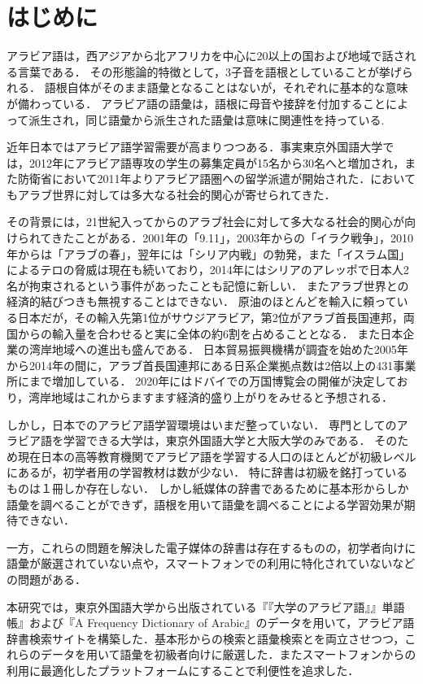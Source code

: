 \documentclass[technicalreport]{ieicej}
\begin{document}
\section{はじめに}
アラビア語は，西アジアから北アフリカを中心に20以上の国および地域で話される言葉である．
その形態論的特徴として，3子音を語根としていることが挙げられる．
語根自体がそのまま語彙となることはないが，それぞれに基本的な意味が備わっている．
アラビア語の語彙は，語根に母音や接辞を付加することによって派生され，同じ語彙から派生された語彙は意味に関連性を持っている.

近年日本ではアラビア語学習需要が高まりつつある．事実東京外国語大学では，2012年にアラビア語専攻の学生の募集定員が15名から30名へと増加され，また防衛省において2011年よりアラビア語圏への留学派遣が開始された\cite{nikkei}．においてもアラブ世界に対しては多大なる社会的関心が寄せられてきた．

その背景には，21世紀入ってからのアラブ社会に対して多大なる社会的関心が向けられてきたことがある．2001年の「9.11」，2003年からの「イラク戦争」，2010年からは「アラブの春」，翌年には「シリア内戦」の勃発，また「イスラム国」によるテロの脅威は現在も続いており，2014年にはシリアのアレッポで日本人2名が拘束されるという事件があったことも記憶に新しい．
またアラブ世界との経済的結びつきも無視することはできない．
原油のほとんどを輸入に頼っている日本だが，その輸入先第1位がサウジアラビア，第2位がアラブ首長国連邦，両国からの輸入量を合わせると実に全体の約6割を占めることとなる\cite{teikoku}．
また日本企業の湾岸地域への進出も盛んである．
日本貿易振興機構が調査を始めた2005年から2014年の間に，アラブ首長国連邦にある日系企業拠点数は2倍以上の431事業所にまで増加している\cite{jetro}．
2020年にはドバイでの万国博覧会の開催が決定しており，湾岸地域はこれからますます経済的盛り上がりをみせると予想される．

しかし，日本でのアラビア語学習環境はいまだ整っていない．
専門としてのアラビア語を学習できる大学は，東京外国語大学と大阪大学のみである．
そのため現在日本の高等教育機関でアラビア語を学習する人口のほとんどが初級レベルにあるが，初学者用の学習教材は数が少ない．
特に辞書は初級を銘打っているものは１冊しか存在しない．
しかし紙媒体の辞書であるために基本形からしか語彙を調べることができず，語根を用いて語彙を調べることによる学習効果が期待できない．

一方，これらの問題を解決した電子媒体の辞書は存在するものの，初学者向けに語彙が厳選されていない点や，スマートフォンでの利用に特化されていないなどの問題がある．

本研究では，東京外国語大学から出版されている『『大学のアラビア語』』単語帳』および『A Frequency Dictionary of Arabic』のデータを用いて，アラビア語辞書検索サイトを構築した．基本形からの検索と語彙検索とを両立させつつ，これらのデータを用いて語彙を初級者向けに厳選した．またスマートフォンからの利用に最適化したプラットフォームにすることで利便性を追求した．
\end{document}
